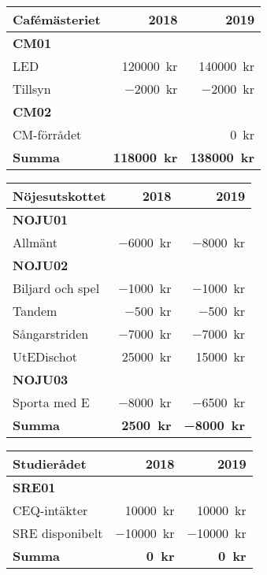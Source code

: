\documentclass[10pt]{article}
\begin{document}
    \begin{tabularx}{10cm}{X r r}
        \textbf{\large Cafémästeriet} & \textbf{2018} & \textbf{2019} \\
        \hline
        \textbf{CM01} \\
        LED & \SI{120000}{kr} & \SI{140000}{kr} \\
        Tillsyn & \SI{-2000}{kr} & \SI{-2000}{kr} \\
        \textbf{CM02} \\
        CM-förrådet & & \SI{0}{kr} \\
        \hline
        \textbf{Summa} & \textbf{\SI{118000}{kr}} & \textbf{\SI{138000}{kr}} \\
    \end{tabularx}
    
    \begin{tabularx}{10cm}{X r r}
        \textbf{\large Nöjesutskottet} & \textbf{2018} & \textbf{2019} \\
        \hline
        \textbf{NOJU01} \\
        Allmänt & \SI{-6000}{kr} & \SI{-8000}{kr} \\
        \textbf{NOJU02} \\
        Biljard och spel & \SI{-1000}{kr} & \SI{-1000}{kr} \\
        Tandem & \SI{-500}{kr} & \SI{-500}{kr} \\
        Sångarstriden & \SI{-7000}{kr} & \SI{-7000}{kr} \\
        UtEDischot & \SI{25000}{kr} & \SI{15000}{kr} \\
        \textbf{NOJU03} \\
        Sporta med E & \SI{-8000}{kr} & \SI{-6500}{kr} \\
        \hline
        \textbf{Summa} & \textbf{\SI{2500}{kr}} & \textbf{\SI{-8000}{kr}} \\
    \end{tabularx}
    
    \begin{tabularx}{10cm}{X r r}
        \textbf{\large Studierådet} & \textbf{2018} & \textbf{2019} \\
        \hline
        \textbf{SRE01} \\
        CEQ-intäkter & \SI{10000}{kr} & \SI{10000}{kr} \\
        SRE disponibelt & \SI{-10000}{kr} & \SI{-10000}{kr} \\
        \hline
        \textbf{Summa} & \textbf{\SI{0}{kr}} & \textbf{\SI{0}{kr}} \\
    \end{tabularx}
    
\end{document}
